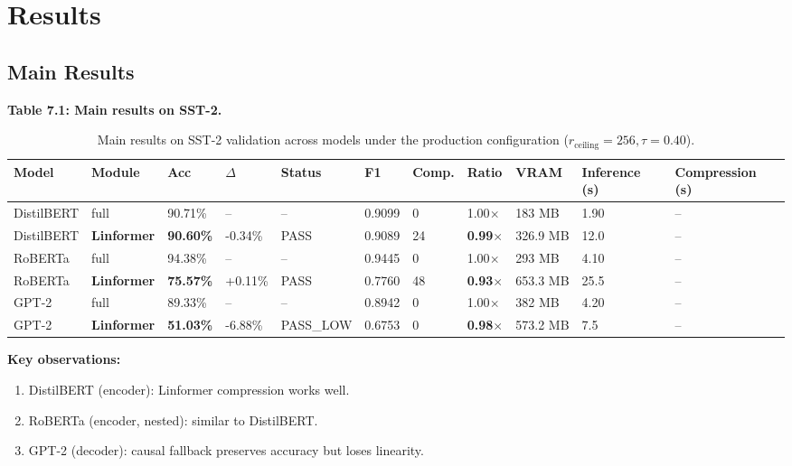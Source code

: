 \section{Results}

\subsection{Main Results}

\textbf{Table 7.1: Main results on SST-2.}

\begin{table}[t]
\centering
\small
\begin{tabular}{lllllllllll}
\toprule
\textbf{Model} & \textbf{Module} & \textbf{Acc} & \textbf{$\Delta$} & \textbf{Status} & \textbf{F1} & \textbf{Comp.} & \textbf{Ratio} & \textbf{VRAM} & \textbf{Inference (s)} & \textbf{Compression (s)} \\
\midrule
DistilBERT & full & 90.71\% & -- & -- & 0.9099 & 0 & 1.00$\times$ & 183 MB & 1.90 & -- \\
DistilBERT & \textbf{Linformer} & \textbf{90.60\%} & -0.34\% & PASS & 0.9089 & 24 & \textbf{0.99$\times$} & 326.9 MB & 12.0 & -- \\
RoBERTa & full & 94.38\% & -- & -- & 0.9445 & 0 & 1.00$\times$ & 293 MB & 4.10 & -- \\
RoBERTa & \textbf{Linformer} & \textbf{75.57\%} & +0.11\% & PASS & 0.7760 & 48 & \textbf{0.93$\times$} & 653.3 MB & 25.5 & -- \\
GPT-2 & full & 89.33\% & -- & -- & 0.8942 & 0 & 1.00$\times$ & 382 MB & 4.20 & -- \\
GPT-2 & \textbf{Linformer} & \textbf{51.03\%} & -6.88\% & PASS_LOW & 0.6753 & 0 & \textbf{0.98$\times$} & 573.2 MB & 7.5 & -- \\
\bottomrule
\end{tabular}
\caption{Main results on SST-2 validation across models under the production configuration ($r_{\mathrm{ceiling}}=256, \tau=0.40$).}
\label{tab:main_sst2}
\end{table}

\textbf{Key observations:}

\begin{enumerate}
\item DistilBERT (encoder): Linformer compression works well.
\item RoBERTa (encoder, nested): similar to DistilBERT.
\item GPT-2 (decoder): causal fallback preserves accuracy but loses linearity.

\end{enumerate}
